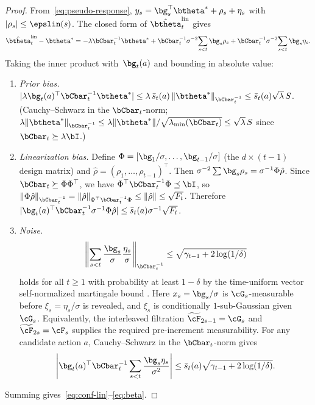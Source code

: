 \begin{proof}
From~\eqref{eq:pseudo-response},
$y_s = \bg_s^\top\btheta^* + \rho_s + \eta_s$ with
$|\rho_s|\le\epslin(s)$.
The closed form of $\hat\btheta_t^{\mathrm{lin}}$ gives
\[
  \hat\btheta_t^{\mathrm{lin}} - \btheta^*
  = -\lambda\bCbar_t^{-1}\btheta^*
    + \bCbar_t^{-1}\sigma^{-2}\!\sum_{s<t}\bg_s\rho_s
    + \bCbar_t^{-1}\sigma^{-2}\!\sum_{s<t}\bg_s\eta_s.
\]
Taking the inner product with~$\bg_t(a)$ and bounding in absolute value:
\begin{enumerate}[nosep,label=(\roman*)]
\item\emph{Prior bias.}\;
$|\lambda\bg_t(a)^\top\bCbar_t^{-1}\btheta^*|
\le \lambda\,\bar s_t(a)\,\|\btheta^*\|_{\bCbar_t^{-1}}
\le \bar s_t(a)\sqrt{\lambda}\,S$.
(Cauchy--Schwarz in the $\bCbar_t$-norm;
$\lambda\|\btheta^*\|_{\bCbar_t^{-1}}
\le \lambda\|\btheta^*\|/\sqrt{\lambda_{\min}(\bCbar_t)}
\le \sqrt{\lambda}\,S$
since $\bCbar_t\succeq\lambda\bI$.)
\item\emph{Linearization bias.}\;
Define $\Phi=[\bg_1/\sigma,\dots,\bg_{t-1}/\sigma]$ (the $d\times(t{-}1)$
design matrix) and $\hat\rho=(\rho_1,\dots,\rho_{t-1})^\top$.
Then $\sigma^{-2}\sum\bg_s\rho_s = \sigma^{-1}\Phi\hat\rho$.
Since $\bCbar_t \succeq \Phi\Phi^\top$, we have
$\Phi^\top\bCbar_t^{-1}\Phi \preceq \bI$, so
$\|\Phi\hat\rho\|_{\bCbar_t^{-1}}
= \|\hat\rho\|_{\Phi^\top\bCbar_t^{-1}\Phi}
\le \|\hat\rho\| \le \sqrt{F_t}$.
Therefore
$|\bg_t(a)^\top\bCbar_t^{-1}\sigma^{-1}\Phi\hat\rho|
\le \bar s_t(a)\sigma^{-1}\sqrt{F_t}$.
\item\emph{Noise.}\;
\[
  \left\|
  \sum_{s<t}\frac{\bg_s}{\sigma}\frac{\eta_s}{\sigma}
  \right\|_{\bCbar_t^{-1}}
  \le
  \sqrt{\gamma_{t-1}+2\log(1/\delta)}
\]
holds for all $t\ge 1$ with probability at least $1-\delta$ by the
time-uniform vector self-normalized martingale bound
\citep{abbasi2011improved}.  Here $x_s=\bg_s/\sigma$ is $\cG_s$-measurable
before $\xi_s=\eta_s/\sigma$ is revealed, and $\xi_s$ is conditionally
$1$-sub-Gaussian given $\cG_s$.  Equivalently, the interleaved filtration
$\widetilde{\cF}_{2s-1}=\cG_s$ and $\widetilde{\cF}_{2s}=\cF_s$ supplies the
required pre-increment measurability.  For any candidate action $a$,
Cauchy--Schwarz in the
$\bCbar_t$-norm gives
\[
  \left|
  \bg_t(a)^\top\bCbar_t^{-1}
  \sum_{s<t}\frac{\bg_s\eta_s}{\sigma^2}
  \right|
  \le
  \bar s_t(a)\sqrt{\gamma_{t-1}+2\log(1/\delta)} .
\]

\end{enumerate}
Summing gives~\eqref{eq:conf-lin}--\eqref{eq:beta}.
\end{proof}

